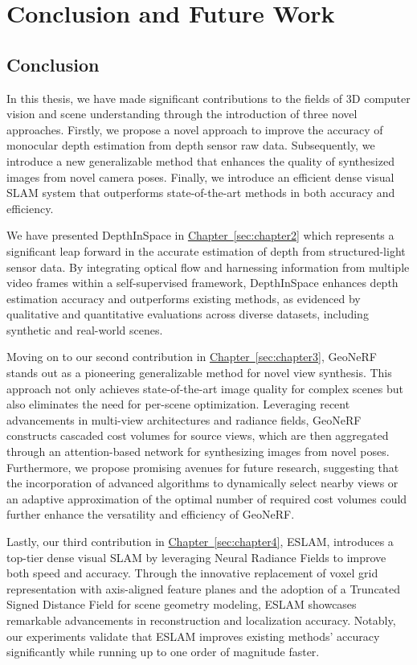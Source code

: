 \chapter{Conclusion and Future Work} \label{sec:chapter5}

\section{Conclusion}

In this thesis, we have made significant contributions to the fields of 3D computer vision and scene understanding through the introduction of three novel approaches. Firstly, we propose a novel approach to improve the accuracy of monocular depth estimation from depth sensor raw data. Subsequently, we introduce a new generalizable method that enhances the quality of synthesized images from novel camera poses. Finally, we introduce an efficient dense visual SLAM system that outperforms state-of-the-art methods in both accuracy and efficiency.

 We have presented DepthInSpace in \hyperref[sec:chapter2]{Chapter~\ref{sec:chapter2}} which represents a significant leap forward in the accurate estimation of depth from structured-light sensor data. By integrating optical flow and harnessing information from multiple video frames within a self-supervised framework, DepthInSpace enhances depth estimation accuracy and outperforms existing methods, as evidenced by qualitative and quantitative evaluations across diverse datasets, including synthetic and real-world scenes.

Moving on to our second contribution in \hyperref[sec:chapter3]{Chapter~\ref{sec:chapter3}}, GeoNeRF stands out as a pioneering generalizable method for novel view synthesis. This approach not only achieves state-of-the-art image quality for complex scenes but also eliminates the need for per-scene optimization. Leveraging recent advancements in multi-view architectures and radiance fields, GeoNeRF constructs cascaded cost volumes for source views, which are then aggregated through an attention-based network for synthesizing images from novel poses. Furthermore, we propose promising avenues for future research, suggesting that the incorporation of advanced algorithms to dynamically select nearby views or an adaptive approximation of the optimal number of required cost volumes could further enhance the versatility and efficiency of GeoNeRF.

Lastly, our third contribution in \hyperref[sec:chapter4]{Chapter~\ref{sec:chapter4}}, ESLAM, introduces a top-tier dense visual SLAM by leveraging Neural Radiance Fields to improve both speed and accuracy. Through the innovative replacement of voxel grid representation with axis-aligned feature planes and the adoption of a Truncated Signed Distance Field for scene geometry modeling, ESLAM showcases remarkable advancements in reconstruction and localization accuracy. Notably, our experiments validate that ESLAM improves existing methods' accuracy significantly while running up to one order of magnitude faster.

